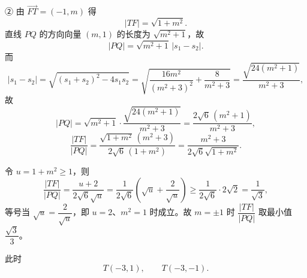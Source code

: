 \begin{answer}
② 由 $\overrightarrow{FT}=(-1,m)$ 得
\nopagebreak[4]
\[|TF|=\sqrt{1+m^2}.\]
直线 $PQ$ 的方向向量 $(m,1)$ 的长度为 $\sqrt{m^2+1}$，故
\nopagebreak[4]
\[|PQ|=\sqrt{m^2+1}\,|s_1-s_2| .\]
而
\nopagebreak[4]
\[|s_1-s_2|=\sqrt{(s_1+s_2)^2-4s_1s_2}
=\sqrt{\frac{16m^2}{(m^2+3)^2}+\frac8{m^2+3}}
=\frac{\sqrt{24(m^2+1)}}{m^2+3},\]
故
\nopagebreak[4]
\[|PQ|=\sqrt{m^2+1}\cdot\frac{\sqrt{24(m^2+1)}}{m^2+3}
=\frac{2\sqrt6\,(m^2+1)}{m^2+3},\]
\nopagebreak[4]
\[\frac{|TF|}{|PQ|}
=\frac{\sqrt{1+m^2}\,(m^2+3)}{2\sqrt6\,(1+m^2)}
=\frac{m^2+3}{2\sqrt6\sqrt{1+m^2}} .\]

令 $u=1+m^2\geqslant 1$，则
\nopagebreak[4]
\[\frac{|TF|}{|PQ|}=\frac{u+2}{2\sqrt6\sqrt u}
=\frac1{2\sqrt6}\left(\sqrt u+\frac2{\sqrt u}\right)
\geqslant\frac1{2\sqrt6}\cdot 2\sqrt2=\frac1{\sqrt3},\]
等号当 $\sqrt u=\dfrac2{\sqrt u}$，即 $u=2$、$m^2=1$ 时成立。故 $m=\pm1$ 时 $\dfrac{|TF|}{|PQ|}$ 取最小值 $\dfrac{\sqrt3}3$。

此时
\nopagebreak[4]
\[T(-3,1),\qquad T(-3,-1).\]



\end{answer}

